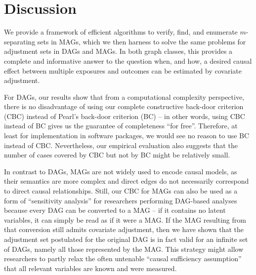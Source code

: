 \section{Discussion}

We provide a framework of efficient algorithms to verify, find, and enumerate $m$-separating sets in MAGs, which we then harness to solve the same problems for adjustment sets in DAGs and MAGs. In both graph classes, this provides a complete and informative answer to the question when, and how, a desired causal effect between multiple exposures and outcomes can be estimated by covariate adjustment. 

For DAGs, our results show that from a computational complexity perspective, there is no disadvantage of using our complete constructive back-door criterion (CBC) instead of Pearl's back-door criterion (BC) -- in other words, using CBC instead of BC gives us the guarantee of completeness ``for free''. Therefore, at least for implementation in software packages, we would see no reason to use BC instead of CBC. Nevertheless, our empirical evaluation also suggests that the number of cases covered by CBC but not by BC might be relatively small.

In contrast to DAGs, MAGs are not widely used to encode causal models, as their semantics are more complex and direct edges do not necessarily correspond to direct causal relationships. Still, our CBC for MAGs can also be used as a form of ``sensitivity analysis'' for researchers performing DAG-based analyses because every DAG can be converted to a MAG -- if it contains no latent variables, it can simply be read as if it were a MAG. If the MAG resulting from that conversion still admits covariate adjustment, then we have shown that the adjustment set postulated for the original DAG is in fact valid for an infinite set of DAGs, namely all those represented by the MAG. This strategy might allow researchers to partly relax the often untenable ``causal sufficiency assumption'' that all relevant variables are known and were measured.

